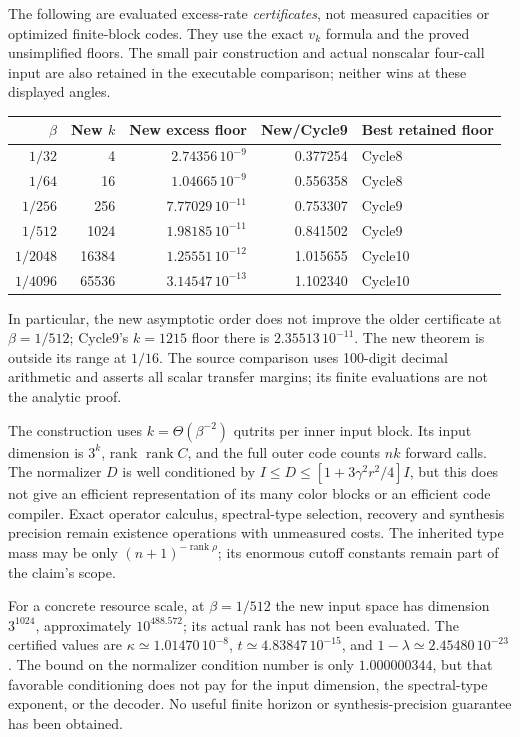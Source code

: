 \documentclass[11pt]{article}
\newcommand{\rank}{\operatorname{rank}}
\begin{document}
The following are evaluated excess-rate \emph{certificates}, not measured
capacities or optimized finite-block codes. They use the exact \(v_k\)
formula and the proved unsimplified floors. The small pair construction
and actual nonscalar four-call input are also retained in the executable
comparison; neither wins at these displayed angles.
\begin{center}\small
\begin{tabular}{rrrrl}
\toprule
\(\beta\)& New \(k\)& New excess floor& New/Cycle9& Best retained floor\\
\midrule
\(1/32\)&4&\(2.74356\,10^{-9}\)&0.377254&Cycle8\\
\(1/64\)&16&\(1.04665\,10^{-9}\)&0.556358&Cycle8\\
\(1/256\)&256&\(7.77029\,10^{-11}\)&0.753307&Cycle9\\
\(1/512\)&1024&\(1.98185\,10^{-11}\)&0.841502&Cycle9\\
\(1/2048\)&16384&\(1.25551\,10^{-12}\)&1.015655&Cycle10\\
\(1/4096\)&65536&\(3.14547\,10^{-13}\)&1.102340&Cycle10\\
\bottomrule
\end{tabular}
\end{center}
In particular, the new asymptotic order does not improve the older
certificate at \(\beta=1/512\); Cycle9's \(k=1215\) floor there is
\(2.35513\,10^{-11}\). The new theorem is outside its range at \(1/16\).
The source comparison uses 100-digit decimal arithmetic and asserts all
scalar transfer margins; its finite evaluations are not the analytic proof.

The construction uses \(k=\Theta(\beta^{-2})\) qutrits per inner input
block. Its input dimension is \(3^k\), rank \(\rank C\), and the full
outer code counts \(nk\) forward calls. The normalizer \(D\) is well
conditioned by \(I\le D\le[1+3\gamma^2r^2/4]I\), but this does not
give an efficient representation of its many color blocks or an efficient
code compiler. Exact operator calculus, spectral-type selection, recovery
and synthesis precision remain existence operations with unmeasured costs.
The inherited type mass may be only \((n+1)^{-\rank\rho}\); its enormous
cutoff constants remain part of the claim's scope.

For a concrete resource scale, at \(\beta=1/512\) the new input space
has dimension \(3^{1024}\), approximately \(10^{488.572}\); its actual
rank has not been evaluated. The certified values are
\(\kappa\simeq1.01470\,10^{-8}\),
\(t\simeq4.83847\,10^{-15}\), and
\(1-\lambda\simeq2.45480\,10^{-23}\).
The bound on the normalizer condition number is only
\(1.000000344\), but that favorable conditioning does not pay for the
input dimension, the spectral-type exponent, or the decoder. No useful
finite horizon or synthesis-precision guarantee has been obtained.
\end{document}
